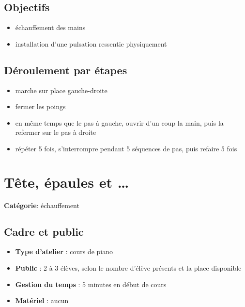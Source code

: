 \documentclass[a4paper,11pt,bibliography=totoc,numbers=noenddot,listof=flat,DIV=11,BCOR=0mm]{scrreprt}%
\begin{document}
\section*{Objectifs}
\begin{itemize}
\item échauffement des mains
\item installation d'une pulsation ressentie physiquement
\end{itemize}


\section*{Déroulement par étapes}
\begin{itemize}
\item marche sur place gauche-droite
\item fermer les poings
\item en même temps que le pas à gauche, ouvrir d'un coup la main, puis la refermer sur le pas à droite
\item répéter 5 fois, s'interrompre pendant 5 séquences de pas, puis refaire 5 fois
\end{itemize}


\chapter[Jeu d'échauffement: Tête, épaules et \ldots{}]{Tête, épaules et \ldots{}}


{\large \textbf{Catégorie}}:
échauffement

\section*{Cadre et public}
\begin{itemize}
\item [\textbullet]\textbf{Type d'atelier} : cours de piano

\item [\textbullet]\textbf{Public} : 2 à 3 élèves, selon le nombre d'élève présents et la place disponible

\item [\textbullet]\textbf{Gestion du temps} : 5 minutes en début de cours

\item [\textbullet]\textbf{Matériel} : aucun
\end{itemize}
\end{document}
